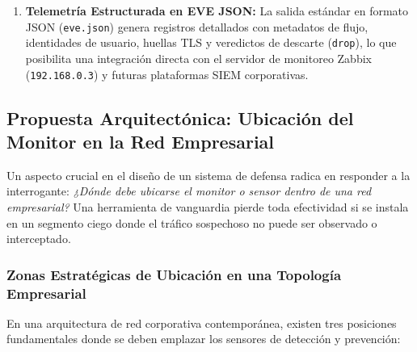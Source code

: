 \begin{enumerate}
  \item \textbf{Telemetría Estructurada en EVE JSON:} La salida estándar en formato JSON (\texttt{eve.json}) genera registros detallados con metadatos de flujo, identidades de usuario, huellas TLS y veredictos de descarte (\texttt{drop}), lo que posibilita una integración directa con el servidor de monitoreo Zabbix (\texttt{192.168.0.3}) y futuras plataformas SIEM corporativas.
\end{enumerate}

\subsection{Propuesta Arquitectónica: Ubicación del Monitor en la Red Empresarial}

Un aspecto crucial en el diseño de un sistema de defensa radica en responder a la interrogante: \textit{¿Dónde debe ubicarse el monitor o sensor dentro de una red empresarial?} Una herramienta de vanguardia pierde toda efectividad si se instala en un segmento ciego donde el tráfico sospechoso no puede ser observado o interceptado.

\subsubsection{Zonas Estratégicas de Ubicación en una Topología Empresarial}

En una arquitectura de red corporativa contemporánea, existen tres posiciones fundamentales donde se deben emplazar los sensores de detección y prevención:

